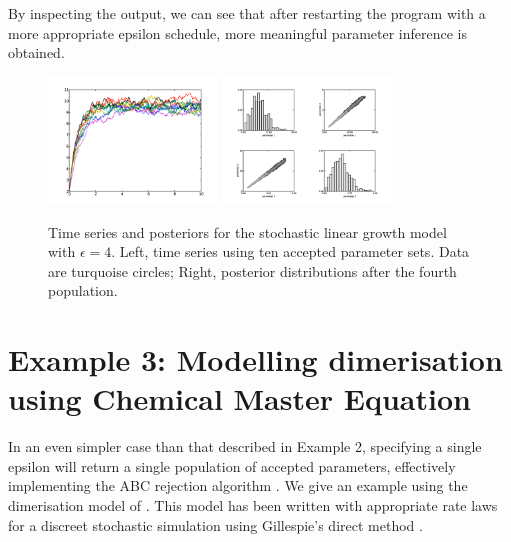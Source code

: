 \documentclass[a4paper]{report}
\begin{document}
By inspecting the output, we can see that after restarting the program with a more appropriate epsilon schedule, more meaningful parameter inference is obtained. 
\begin{figure}[htbp]
\centering
\includegraphics[width=0.4\textwidth]{Graphics/TimeSeriesLinGrow2.png}
\includegraphics[width=0.4\textwidth]{Graphics/ScatterPlotsLinGrow2.png}
\caption{Time series and posteriors for the stochastic linear growth model with $\epsilon = 4$. Left, time series using ten accepted parameter sets. Data are turquoise circles; Right, posterior distributions after the fourth population. \label{LinGrow2}}
\end{figure}

\section{Example 3: Modelling dimerisation using Chemical Master Equation}
In an even simpler case than that described in Example 2, specifying a single epsilon will return a single population of accepted parameters, effectively implementing the ABC rejection algorithm \citep{ABCrejection}. We give an example using the dimerisation model of \citep{Wilkinson2006}. This model has been written with appropriate rate laws for a discreet stochastic simulation using Gillespie's direct method \citep{Gillespie1977}. 
\end{document}
